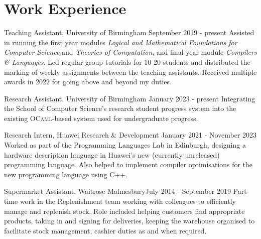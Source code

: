 
\section*{Work Experience}
\stroke

\begin{work}{%
    Teaching Assistant, University of Birmingham
}{September 2019 - present}%
    Assisted in running the first year modules
    \textit{Logical and Mathematical Foundations for Computer Science} and
    \textit{Theories of Computation}, and final year module
    \textit{Compilers \& Languages}.
    Led regular group tutorials for 10-20 students and distributed
    the marking of weekly assignments between the teaching assistants.
    Received multiple awards in 2022 for going above and beyond my duties.
\end{work}

\begin{work}{%
    Research Assistant, University of Birmingham
}{January 2023 - present}%
    Integrating the School of Computer Science's research student progress
    system into the existing \textsc{OCaml}-based system used for undergraduate
    progress.
\end{work}

\begin{work}{%
    Research Intern, Huawei Research \& Development
}{January 2021 - November 2023}%
    Worked as part of the Programming Languages Lab in Edinburgh, designing a
    hardware description language in Huawei's new (currently unreleased)
    programming language.
    Also helped to implement compiler optimisations for the new programming
    language using \textsc{C++}.
\end{work}

\begin{work}{%
    Supermarket Assistant, Waitrose Malmesbury}{July 2014 - September 2019}%
    \noindent Part-time work in the Replenishment team working with colleagues
    to efficiently manage and replenish stock. Role included helping customers
    find appropriate products, taking in and signing for deliveries, keeping the
    warehouse organised to facilitate stock management, cashier duties as and
    when required.
\end{work}